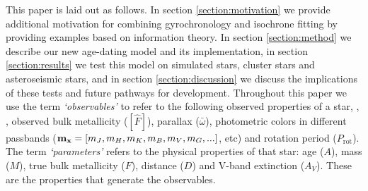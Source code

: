 This paper is laid out as follows.
In section \ref{section:motivation} we provide additional motivation for
combining gyrochronology and isochrone fitting by providing examples based
on information theory.
In section \ref{section:method} we describe our new age-dating model and its
implementation, in section \ref{section:results} we test this model on
simulated stars, cluster stars and asteroseismic stars, and in section
\ref{section:discussion} we discuss the implications of these tests and future
pathways for development.
Throughout this paper we use the term {\it `observables'} to refer to the
following observed properties of a star, \teff, \logg, observed bulk
metallicity ($[\hat{F}]$), parallax ($\bar{\omega}$), photometric
colors in different passbands (${\bf m_x} = [m_J, m_H, m_K, m_B, m_V, m_G,
...]$, etc) and rotation period
($P_{\mathrm{rot}}$).
The term {\it `parameters'} refers to the physical properties of that star:
age ($A$), mass ($M$), true bulk metallicity ($F$), distance ($D$) and V-band
extinction ($A_V$).
These are the properties that generate the observables.
